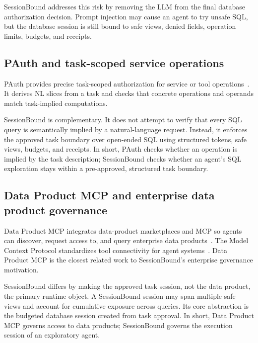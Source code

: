 \documentclass[journal]{IEEEtran}
\begin{document}
SessionBound addresses this risk by removing the LLM from the final
database authorization decision. Prompt injection may cause an agent to
try unsafe SQL, but the database session is still bound to safe views,
denied fields, operation limits, budgets, and receipts.

\hypertarget{pauth-and-task-scoped-service-operations}{%
\subsection{PAuth and task-scoped service
operations}\label{pauth-and-task-scoped-service-operations}}

PAuth provides precise task-scoped authorization for service or tool
operations~\cite{sharma2026pauth}. It derives NL slices from a task and
checks that concrete operations and operands match task-implied
computations.

SessionBound is complementary. It does not attempt to verify that every
SQL query is semantically implied by a natural-language request.
Instead, it enforces the approved task boundary over open-ended SQL
using structured tokens, safe views, budgets, and receipts. In short,
PAuth checks whether an operation is implied by the task description;
SessionBound checks whether an agent's SQL exploration stays within a
pre-approved, structured task boundary.

\hypertarget{data-product-mcp-and-enterprise-data-product-governance}{%
\subsection{Data Product MCP and enterprise data product
governance}\label{data-product-mcp-and-enterprise-data-product-governance}}

Data Product MCP integrates data-product marketplaces and MCP so agents
can discover, request access to, and query enterprise data
products~\cite{tonnarelli2026dataproductmcp}. The Model Context
Protocol standardizes tool connectivity for agent
systems~\cite{mcp2025specification}. Data Product MCP is the closest
related work to SessionBound's enterprise governance motivation.

SessionBound differs by making the approved task session, not the data
product, the primary runtime object. A SessionBound session may span
multiple safe views and account for cumulative exposure across queries.
Its core abstraction is the budgeted database session created from task
approval. In short, Data Product MCP governs access to data products;
SessionBound governs the execution session of an exploratory agent.
\end{document}
